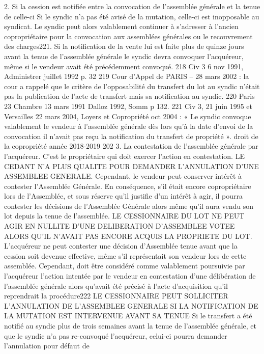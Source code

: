 	2. Si la cession est notifiée entre la convocation de l’assemblée générale et la
	tenue de celle-ci
	Si le syndic n'a pas été avisé de la mutation, celle-ci est inopposable au syndicat. Le syndic peut alors
	valablement continuer à s'adresser à l'ancien copropriétaire pour la convocation aux assemblées générales
	ou le recouvrement des charges221.
	Si la notification de la vente lui est faite plus de quinze jours avant la tenue de l'assemblée générale le
	syndic devra convoquer l’acquéreur, même si le vendeur avait été précédemment convoqué.
	218 Civ 3\ieme{} 6 nov 1991, Administrer juillet 1992 p. 32
	219 Cour d’Appel de PARIS – 28 mars 2002 : la cour a rappelé que le critère de l’opposabilité du transfert du lot au syndic
	n’était pas la publication de l’acte de transfert mais sa notification au syndic.
	220 Paris 23\ieme{} Chambre 13 mars 1991 Dalloz 1992, Somm p 132.
	221 Civ 3\ieme{}, 21 juin 1995 et Versailles 22 mars 2004, Loyers et Copropriété oct 2004  : « Le syndic convoque
	valablement le vendeur à l'assemblée générale dès lors qu’à la date d’envoi de la convocation il n’avait pas reçu la
	notification du transfert de propriété ».
	droit de la copropriété année 2018-2019
	202
	3. La contestation de l’assemblée générale par l’acquéreur.
	C'est le propriétaire qui doit exercer l'action en contestation.
	LE CEDANT N’A PLUS QUALITE POUR DEMANDER L’ANNULATION D’UNE ASSEMBLEE GENERALE.
	Cependant, le vendeur peut conserver intérêt à contester l'Assemblée Générale. En conséquence, s'il était
	encore copropriétaire lors de l'Assemblée, et sous réserve qu'il justifie d'un intérêt à agir, il pourra
	contester les décisions de l'Assemblée Générale alors même qu'il aura vendu son lot depuis la tenue de
	l'assemblée.
	LE CESSIONNAIRE DU LOT NE PEUT AGIR EN NULLITE D'UNE DELIBERATION D'ASSEMBLEE VOTEE
	ALORS QU’IL N’AVAIT PAS ENCORE ACQUIS LA PROPRIETE DU LOT.
	L'acquéreur ne peut contester une décision d'Assemblée tenue avant que la cession soit devenue effective,
	même s'il représentait son vendeur lors de cette assemblée. Cependant, doit être considéré comme
	valablement poursuivie par l’acquéreur l’action intentée par le vendeur en contestation d'une délibération
	de l'assemblée générale alors qu’avait été précisé à l’acte d’acquisition qu'il reprendrait la procédure222
	LE CESSIONNAIRE PEUT SOLLICITER L’ANNULATION DE L’ASSEMBLEE GENERALE SI LA
	NOTIFICATION DE LA MUTATION EST INTERVENUE AVANT SA TENUE
	Si le transfert a été notifié au syndic plus de trois semaines avant la tenue de l'assemblée générale, et que
	le syndic n’a pas re-convoqué l’acquéreur, celui-ci pourra demander l’annulation pour défaut de
